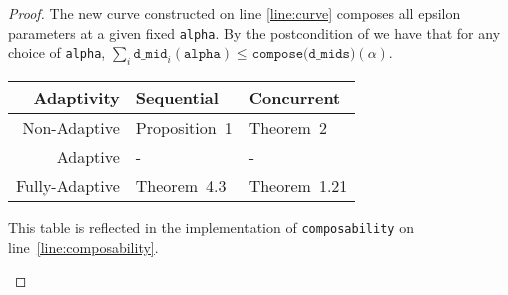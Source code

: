 \documentclass{article}
\begin{document}
\begin{proof}
  The new curve constructed on line \ref{line:curve} composes all epsilon parameters at a given fixed \texttt{alpha}.
  By the postcondition of  we have that for any choice of \texttt{alpha}, $\sum_i \texttt{d\_mid}_i(\texttt{alpha}) \le \texttt{compose(d\_mids)}(\alpha)$.

  \begin{center}
    \begin{tabular}{ r | l l }
      Adaptivity & Sequential & Concurrent \\ 
      \hline
      Non-Adaptive & Proposition~1\cite{mironov2017renyi} & Theorem~2\cite{lyu2022interactive} \\  
      Adaptive & - & - \\
      Fully-Adaptive & Theorem~4.3\cite{feldman2022individual} & Theorem~1.21\cite{vadhan2021concurrent}
    \end{tabular}

    This table is reflected in the implementation of \texttt{composability} on line~\ref{line:composability}.
  \end{center}
  
\end{proof}



\end{document}

